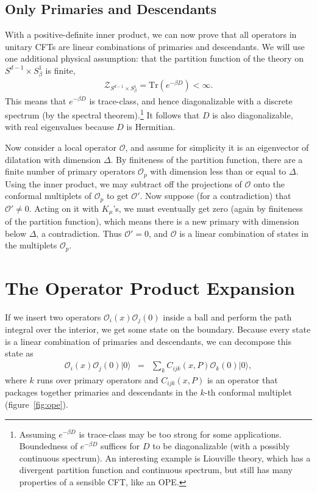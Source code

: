 \documentclass[11pt]{ws-rv9x6}
\newcommand\be{\begin{eqnarray}}
\newcommand\ee{\end{eqnarray}}
\newcommand\cO{\mathcal{O}}
\newcommand\<\langle
\renewcommand\>\rangle
\renewcommand\.{\cdot}
\newcommand\x\times
\newcommand\De{\Delta}
\newcommand\oo\infty
\renewcommand\b\beta
\newcommand\Tr{\mathrm{Tr}}
\begin{document}
\subsection{Only Primaries and Descendants}
\label{sec:onlyprimariesanddescendants}

With a positive-definite inner product, we can now prove that all operators in unitary CFTs are linear combinations of primaries and descendants. We will use one additional physical assumption: that the partition function of the theory on $S^{d-1}\x S^1_\beta$ is finite,
\be
\mathcal{Z}_{S^{d-1}\x S^1_\beta} = \Tr(e^{-\beta D}) < \oo.
\ee
This means that $e^{-\beta D}$ is trace-class, and hence diagonalizable with a discrete spectrum (by the spectral theorem).\footnote{Assuming $e^{-\b D}$ is trace-class may be too strong for some applications. Boundedness of $e^{-\b D}$ suffices for $D$ to be diagonalizable (with a possibly continuous spectrum). An interesting example is Liouville theory, which has a divergent partition function and continuous spectrum, but still has many properties of a sensible CFT, like an OPE.} It follows that $D$ is also diagonalizable, with real eigenvalues because $D$ is Hermitian.

Now consider a local operator $\cO$, and assume for simplicity it is an eigenvector of dilatation with dimension $\De$.  By finiteness of the partition function, there are a finite number of primary operators $\cO_p$ with dimension less than or equal to $\De$.  Using the inner product, we may subtract off the projections of $\cO$ onto the conformal multiplets of $\cO_p$ to get $\cO'$.  Now suppose (for a contradiction) that $\cO'\neq 0$.  Acting on it with $K_\mu$'s, we must eventually get zero (again by finiteness of the partition function), which means there is a new primary with dimension below $\De$, a contradiction.  Thus $\cO'=0$, and $\cO$ is a linear combination of states in the multiplets $\cO_p$.

\section{The Operator Product Expansion}

If we insert two operators $\cO_i(x)\cO_j(0)$ inside a ball and perform the path integral over the interior, we get some state on the boundary.  Because every state is a linear combination of primaries and descendants, we can decompose this state as
\be
\label{eq:opeinitial}
\cO_i(x)\cO_j(0)|0\> &=& \sum_{k}C_{ijk}(x,P)\cO_k(0) |0\>,
\ee
where $k$ runs over primary operators and $C_{ijk}(x,P)$ is an operator that packages together primaries and descendants in the $k$-th conformal multiplet (figure~\ref{fig:ope}).
\end{document}
